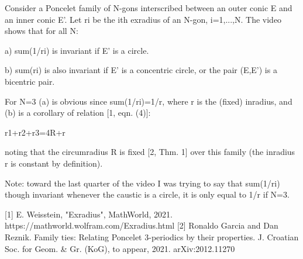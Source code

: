 Consider a Poncelet family of N-gons interscribed between an outer conic E and an inner conic E'. Let ri be the ith exradius of an N-gon, i=1,...,N.  The video shows that for all N:

a) sum(1/ri) is invariant if E' is a circle.

b) sum(ri) is also invariant if E' is a concentric circle, or the pair (E,E') is a bicentric pair. 

For N=3 (a) is obvious since sum(1/ri)=1/r, where r is the (fixed) inradius, and (b) is a corollary of relation [1, eqn. (4)]:

r1+r2+r3=4R+r

noting that the circumradius R is fixed [2, Thm. 1] over this family (the inradius r is constant by definition).

Note: toward the last quarter of the video I was trying to say that sum(1/ri) though invariant whenever the caustic is a circle, it is only equal to 1/r if N=3. 

[1] E. Weisstein, "Exradius", MathWorld, 2021. https://mathworld.wolfram.com/Exradius.html
[2]  Ronaldo Garcia and Dan Reznik. Family ties: Relating Poncelet 3-periodics by their properties. J. Croatian Soc. for Geom. & Gr. (KoG), to appear, 2021. arXiv:2012.11270